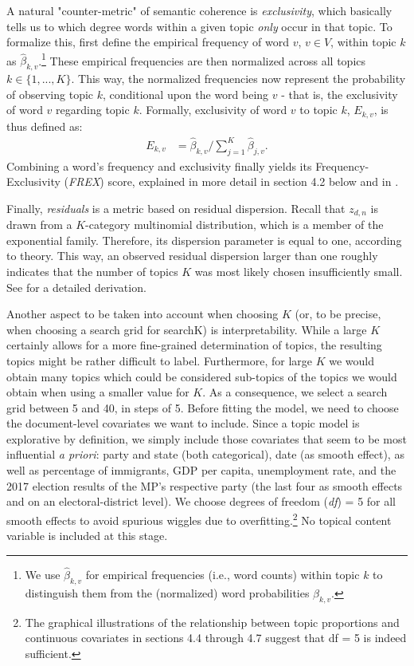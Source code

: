 A natural "counter-metric" of semantic coherence is \textit{exclusivity}, which basically tells us to which degree words within a given topic \textit{only} occur in that topic. To formalize this, first define the empirical frequency of word $v$, $v\in{V}$, within topic $k$ as $\hat{\beta}_{k,v}$.\footnote{We use $\hat{\beta}_{k,v}$ for empirical frequencies (i.e., word counts) within topic $k$ to distinguish them from the (normalized) word probabilities $\beta_{k,v}$.} These empirical frequencies are then normalized across all topics $k\in\{1,...,K\}$. This way, the normalized frequencies now represent the probability of observing topic $k$, conditional upon the word being $v$ - that is, the exclusivity of word $v$ regarding topic $k$. Formally, exclusivity of word $v$ to topic $k$, $E_{k,v}$, is thus defined as:
\begin{align*}
E_{k,v} &= \hat{\beta}_{k,v}/\sum_{j=1}^{K}\hat{\beta}_{j,v}.
\end{align*}
Combining a word's frequency and exclusivity finally yields its Frequency-Exclusivity (\textit{FREX}) score, explained in more detail in section 4.2 below and in \cite{bischof2012summarizing}.

Finally, \textit{residuals} is a metric based on residual dispersion. Recall that $z_{d,n}$ is drawn from a $K$-category multinomial distribution, which is a member of the exponential family. Therefore, its dispersion parameter is equal to one, according to theory. This way, an observed residual dispersion larger than one roughly indicates that the number of topics $K$ was most likely chosen insufficiently small. See \cite{taddy2012estimation} for a detailed derivation.

Another aspect to be taken into account when choosing $K$ (or, to be precise, when choosing a search grid for searchK) is interpretability. While a large $K$ certainly allows for a more fine-grained determination of topics, the resulting topics might be rather difficult to label. Furthermore, for large $K$ we would obtain many topics which could be considered sub-topics of the topics we would obtain when using a smaller value for $K$. As a consequence, we select a search grid between 5 and 40, in steps of 5. Before fitting the model, we need to choose the document-level covariates we want to include. Since a topic model is explorative by definition, we simply include those covariates that seem to be most influential \textit{a priori}: party and state (both categorical), date (as smooth effect), as well as percentage of immigrants, GDP per capita, unemployment rate, and the 2017 election results of the MP's respective party (the last four as smooth effects and on an electoral-district level). We choose degrees of freedom (\textit{df}) = 5 for all smooth effects to avoid spurious wiggles due to overfitting.\footnote{The graphical illustrations of the relationship between topic proportions and continuous covariates in sections 4.4 through 4.7 suggest that df = 5 is indeed sufficient.} No topical content variable is included at this stage.

